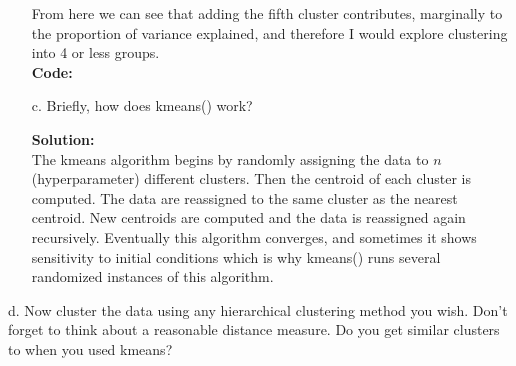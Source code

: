 \documentclass[12pt]{article}
\makeatletter
\theoremstyle{homework}
\newenvironment{exercise}[1]
{\def\@currentlabel{#1}\exercisecore}
{\endexercisecore}
\newcommand{\localhead}[1]{\par\smallskip\noindent\textbf{#1}\nobreak\\}%
\newcommand\solution{\localhead{Solution:}}
\makeatother
\begin{document}
\begin{exercise}{2}
\begin{enumerate}
\begin{figure}[H]
\begin{center}
      \end{center}
    \end{figure}
    From here we can see that adding the fifth cluster contributes, marginally to the proportion of variance explained, and therefore I would explore clustering into 4
    or less groups. \\
    \textbf{Code:}
    \begin{center}
    
    \end{center}
    \vspace{.15in}


    \item[c.] Briefly, how does kmeans() work?\\
    \solution The kmeans algorithm begins by randomly assigning the data to $n$(hyperparameter) different clusters. Then the centroid of each cluster is computed. 
    The data are reassigned to the same cluster as the nearest centroid. New centroids are computed and the data is reassigned again recursively. Eventually this algorithm 
    converges, and sometimes it shows sensitivity to initial conditions which is why kmeans() runs several randomized instances of this algorithm.
  \end{enumerate}
  \vspace{.15in}


  \item[d.] Now cluster the data using any hierarchical clustering method you wish. Don't forget to think about a reasonable distance measure. Do you get similar clusters to when you used kmeans?\\
   

  
\end{exercise}
\end{document}
